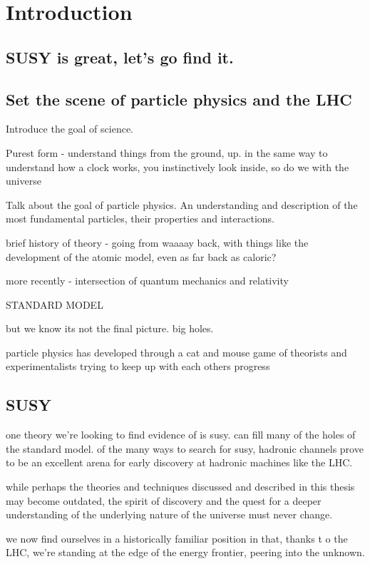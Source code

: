 
\chapter{Introduction}  %

\ifpdf
    \graphicspath{{Chapter1/Figs/Raster/}{Chapter1/Figs/PDF/}{Chapter1/Figs/}}
\else
    \graphicspath{{Chapter1/Figs/Vector/}{Chapter1/Figs/}}
\fi


\section{SUSY is great, let's go find it.}  %
\label{sec:introduction_intro}

\section{Set the scene of particle physics and the LHC}

Introduce the goal of science.

Purest form - understand things from the ground, up.
    in the same way to understand how a clock works, you instinctively look
    inside, so do we with the universe

Talk about the goal of particle physics.
    An understanding and description of the most fundamental particles, their 
    properties and interactions.

brief history of theory - going from waaaay back, with things like the
development of the atomic model, even as far back as caloric?

more recently - intersection of quantum mechanics and relativity

STANDARD MODEL

but we know its not the final picture. big holes.

particle physics has developed through a cat and mouse game of theorists and
experimentalists trying to keep up with each others progress

\section{SUSY}
one theory we're looking to find evidence of is susy. can fill many of the holes
of the standard model.
of the many ways to search for susy, hadronic channels prove to be an excellent
arena for early discovery at hadronic machines like the LHC.


while perhaps the theories and techniques discussed and described in this thesis
may become outdated, the spirit of discovery and the quest for a deeper
understanding of the underlying nature of the universe must never change.

we now find ourselves in a historically familiar position in that, thanks t
o the LHC, we're standing
at the edge of the energy frontier, peering into the unknown.
